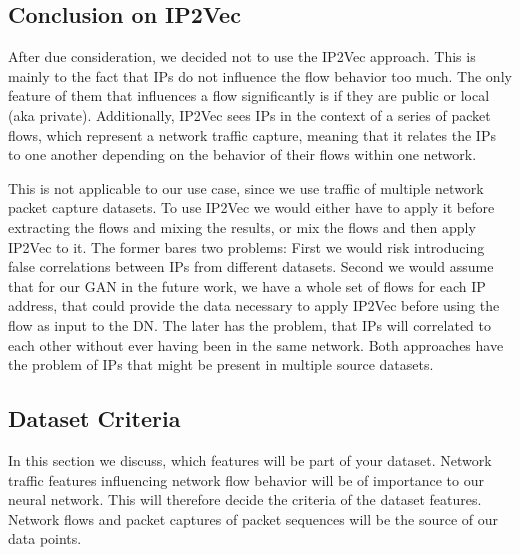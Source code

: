 \documentclass[
	ngerman,
	ruledheaders=section,%
	class=report,%
	thesis={type=bachelor},%
	accentcolor=9c,%
	custommargins=true,%
	marginpar=false,%
	parskip=half-,%
	fontsize=11pt,%
]{tudapub}
\begin{document}
\subsection{Conclusion on IP2Vec}




After due consideration, we decided not to use the IP2Vec approach.
This is mainly to the fact that IPs do not influence the flow behavior too much.
The only feature of them that influences a flow significantly is if they are public or local (aka private).
Additionally, IP2Vec sees IPs in the context of a series of packet flows, which represent a network traffic capture,
meaning that it relates the IPs to one another depending on the behavior of their flows within one network.

This is not applicable to our use case, since we use traffic of multiple network packet capture datasets.
To use IP2Vec we would either have to apply it before extracting the flows and mixing the results,
or mix the flows and then apply IP2Vec to it.
The former bares two problems:
First we would risk introducing false correlations between IPs from different datasets.
Second we would assume that for our GAN in the future work, we have a whole set of flows for each IP address, that could provide the data necessary to apply IP2Vec before using the flow as input to the DN.
The later has the problem, that IPs will correlated to each other without ever having been in the same network.
Both approaches have the problem of IPs that might be present in multiple source datasets.

\subsection{Dataset Criteria}

In this section we discuss, which features will be part of your dataset. %
Network traffic features influencing network flow behavior will be of importance to our neural network.
This will therefore decide the criteria of the dataset features.
Network flows and packet captures of packet sequences will be the source of our data points.
\end{document}
